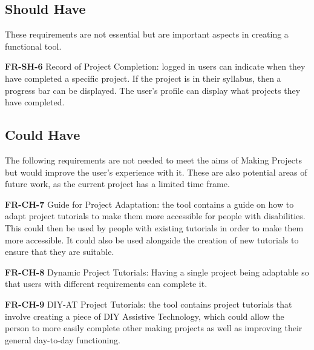\documentclass{l4proj}
\begin{document}

\subsection{Should Have}
These requirements are not essential but are important aspects in creating a functional tool.

\textbf{FR-SH-6} Record of Project Completion: logged in users can indicate when they have completed a specific project. If the project is in their syllabus, then a progress bar can be displayed. The user's profile can display what projects they have completed. 


\subsection{Could Have}
The following requirements are not needed to meet the aims of Making Projects but would improve the user's experience with it. These are also potential areas of future work, as the current project has a limited time frame. 

\textbf{FR-CH-7} Guide for Project Adaptation: the tool contains a guide on how to adapt project tutorials to make them more accessible for people with disabilities. This could then be used by people with existing tutorials in order to make them more accessible. It could also be used alongside the creation of new tutorials to ensure that they are suitable. 

\textbf{FR-CH-8} Dynamic Project Tutorials: Having a single project being adaptable so that users with different requirements can complete it. 

\textbf{FR-CH-9} DIY-AT Project Tutorials: the tool contains project tutorials that involve creating a piece of DIY Assistive Technology, which could allow the person to more easily complete other making projects as well as improving their general day-to-day functioning. 
\end{document}
